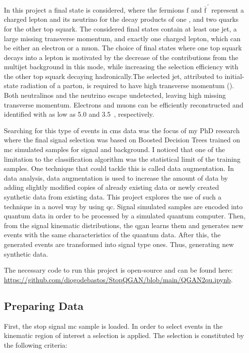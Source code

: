 In this project a final state is considered, where the fermions ${\mathrm{f}}$ 
and $\overline{\mathrm{f}}^{\,\prime}$ represent a charged lepton and its 
neutrino for the decay products of one \stp, and two quarks for the other top 
squark. 
The considered final states contain at least one jet, a large missing transverse
momentum, and exactly one charged lepton, which can be either an electron or a 
muon. The choice of final states where one top squark decays into a lepton is 
motivated by the decrease of the contributions from the multijet background in 
this mode, while increasing the selection efficiency with the other top squark 
decaying hadronically.The selected jet, attributed to initial-state radiation of
a parton, is required to have high transverse momentum (\pt). Both neutralinos 
and the neutrino escape undetected, leaving high missing transverse momentum. 
Electrons and muons can be efficiently reconstructed and identified with \pt as 
low as 5.0 and 3.5~\GeV, respectively. 

Searching for this type of events in \gls{cms} data was the focus of my PhD
research where the final signal selection was based on Boosted Decision Trees 
trained on \gls{mc} simulated samples for signal and background. I noticed that
one of the limitation to the classification algorithm was the statistical limit 
of the training samples. One technique that could tackle this is called data 
augmentation. In data analysis, data augmentation is used to increase the amount
of data by adding slightly modified copies of already existing data or newly 
created synthetic data from existing data. This project
explores the use of such a technique in a novel way by using \gls{qc}. Signal 
simulated samples are encoded into quantum data in order to be processed by
a simulated quantum computer. Then, from the signal kinematic distributions, the
\gls{qgan} learns them and generates new events with the same characteristics 
of the quantum data. After this, the generated events are transformed into  
signal type ones. Thus, generating new synthetic data.

The necessary code to run this project is open-source and can be found here:
\url{https://github.com/diogodebastos/StopQGAN/blob/main/QGAN2qu.ipynb}.

\subsection{Preparing Data}
\label{sec:prep}

First, the stop signal \gls{mc} sample is loaded. In order to select events in
the kinematic region of interest a selection is applied. The selection is 
constituted by the following criteria: 

